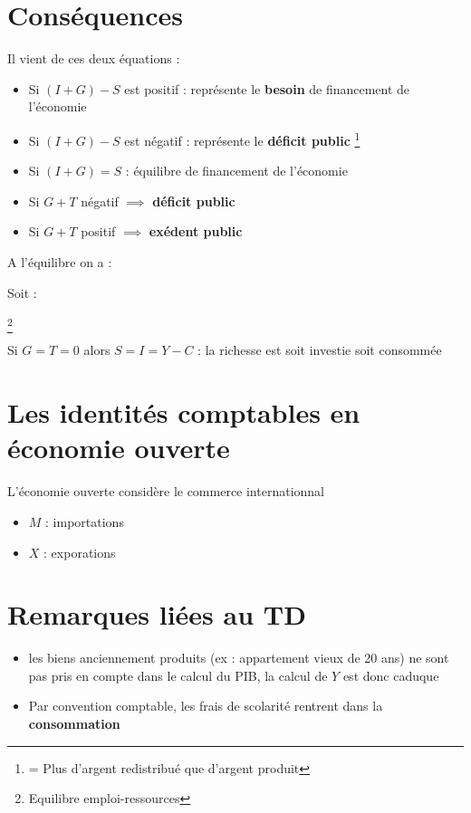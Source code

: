 \section{Conséquences}
Il vient de ces deux équations : 
\begin{center}
    \Large{}
\end{center}
\begin{itemize}
    \item Si $(I + G) - S$ est positif : représente le \textbf{besoin} de financement de l'économie
    \item Si $(I + G) - S$ est négatif : représente le \textbf{déficit public} \footnote{= Plus d'argent redistribué que d'argent produit}
    \item Si $(I + G) = S$ : équilibre de financement de l'économie
\end{itemize}
\begin{itemize}
    \item Si $G + T$ négatif $\implies$ \textbf{déficit public}
    \item Si $G + T$ positif $\implies$ \textbf{exédent public} \newline
\end{itemize}
\newpage
A l'équilibre on a : 
\begin{center}
    \Large{}
\end{center}
Soit : 
\begin{center}
    \Large{} \footnote{Equilibre emploi-ressources}
\end{center}
Si $G = T = 0$ alors $S = I = Y - C$ : la richesse est soit investie soit consommée \newline
\section{Les identités comptables en économie ouverte}
L'économie ouverte considère le commerce internationnal
\begin{center}
    \Large{}
\end{center}
\begin{itemize}
    \item $M$ : importations
    \item $X$ : exporations
\end{itemize}
\newpage
\section{Remarques liées au TD}
\begin{itemize}
    \item les biens anciennement produits (ex : appartement vieux de 20 ans) ne sont pas pris en compte dans le calcul du PIB, la calcul de $Y$ est donc caduque 
    \item Par convention comptable, les frais de scolarité rentrent dans la \textbf{consommation}
\end{itemize}
